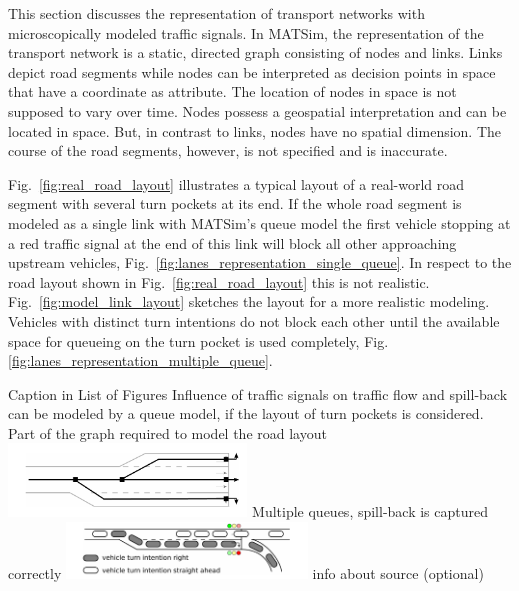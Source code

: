 This section discusses the representation of transport networks with microscopically modeled traffic signals. 
In MATSim, the representation of  the transport network is a static, directed graph consisting of nodes and links. 
Links depict road segments while nodes can be interpreted as decision points in space that have a coordinate as attribute. 
The location of nodes in space is not supposed to vary over time. 
Nodes possess a geospatial interpretation and can be located in space. 
But, in contrast to links, nodes have no spatial dimension.  
The course of the road segments, however, is not specified and is inaccurate. 


Fig.~\ref{fig:real_road_layout} illustrates a typical layout of a real-world road segment with several turn pockets at its end. 
If the whole road segment is modeled as a single link with MATSim's queue model the first vehicle stopping at a red traffic signal at the end of this link will block all other approaching upstream vehicles, Fig.~\ref{fig:lanes_representation_single_queue}. 
In respect to the road layout shown in Fig.~\ref{fig:real_road_layout} this is not realistic. 
Fig.~\ref{fig:model_link_layout} sketches the layout for a more realistic modeling. 
Vehicles with distinct turn intentions do not block each other until the available space for queueing on the turn pocket is used completely, Fig.\ref{fig:lanes_representation_multiple_queue}. 

\createfigure%
{Caption in List of Figures}%
{Influence of traffic signals on traffic flow and spill-back can be modeled by a queue model, if the layout of turn pockets is considered.}
{\label{fig:lanes_representation}}%
{%
  \createsubfigure%
	{Part of the graph required to model the road layout}
	{\includegraphics[width=0.475\textwidth]{extending/figures/signalslanes/link_lanes_layout}}
	{\label{fig:model_link_layout}}
  \createsubfigure%
	{Multiple queues, spill-back is captured correctly}%
	{\includegraphics[width=0.48\textwidth]{extending/figures/signalslanes/multiple_queue_model_inkscape.pdf}}%
	{\label{fig:lanes_representation_multiple_queue}}%
}%
{info about source (optional)}


